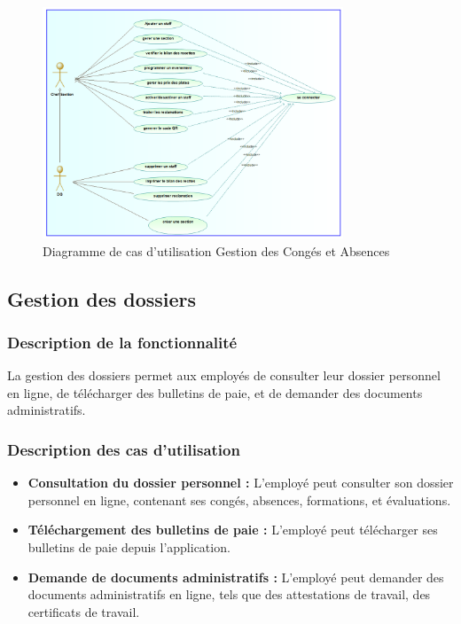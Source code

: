 \begin{figure}[H]
    \centering
    \includegraphics[width=0.8\textwidth]{images/diagrammes/use-cases/DG.png}
    \caption{Diagramme de cas d'utilisation Gestion des Congés et Absences}
    \label{fig:use_case_gestion_conges}

\end{figure}


\subsection{Gestion des dossiers}
\subsubsection{Description de la fonctionnalité}
La gestion des dossiers permet aux employés de consulter leur dossier personnel en ligne, de télécharger des bulletins de paie, et de demander des documents administratifs.
\subsubsection{Description des cas d'utilisation}
\begin{itemize}
    \item \textbf{Consultation du dossier personnel :} L'employé peut consulter son dossier personnel en ligne, contenant ses congés, absences, formations, et évaluations.
    \item \textbf{Téléchargement des bulletins de paie :} L'employé peut télécharger ses bulletins de paie depuis l'application.
    \item \textbf{Demande de documents administratifs :} L'employé peut demander des documents administratifs en ligne, tels que des attestations de travail, des certificats de travail.
\end{itemize}


